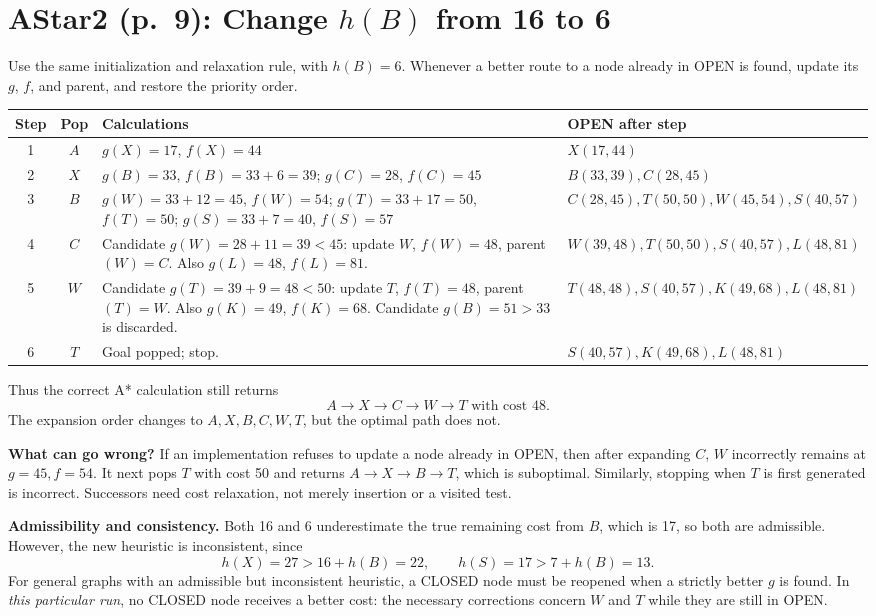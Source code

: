 \documentclass[11pt,a4paper]{article}
\newcommand{\question}[2]{\section*{#1: #2}}
\begin{document}
\newpage
\question{AStar2 (p.\ 9)}{Change $h(B)$ from 16 to 6}
Use the same initialization and relaxation rule, with $h(B)=6$. Whenever a better route to a node already in OPEN is found, update its $g$, $f$, and parent, and restore the priority order.
\begin{center}\small\begin{tabular}{c|c|p{6.2cm}|p{4.6cm}}\toprule
Step&Pop&Calculations&OPEN after step\\\midrule
1&$A$&$g(X)=17$, $f(X)=44$&$X(17,44)$\\
2&$X$&$g(B)=33$, $f(B)=33+6=39$; $g(C)=28$, $f(C)=45$&$B(33,39),C(28,45)$\\
3&$B$&$g(W)=33+12=45$, $f(W)=54$; $g(T)=33+17=50$, $f(T)=50$; $g(S)=33+7=40$, $f(S)=57$&$C(28,45),T(50,50),W(45,54),S(40,57)$\\
4&$C$&Candidate $g(W)=28+11=39<45$: update $W$, $f(W)=48$, parent$(W)=C$. Also $g(L)=48$, $f(L)=81$.&$W(39,48),T(50,50),S(40,57),L(48,81)$\\
5&$W$&Candidate $g(T)=39+9=48<50$: update $T$, $f(T)=48$, parent$(T)=W$. Also $g(K)=49$, $f(K)=68$. Candidate $g(B)=51>33$ is discarded.&$T(48,48),S(40,57),K(49,68),L(48,81)$\\
6&$T$&Goal popped; stop.&$S(40,57),K(49,68),L(48,81)$\\\bottomrule\end{tabular}\normalsize\end{center}
Thus the correct A* calculation still returns
\[
\boxed{A\to X\to C\to W\to T\text{ with cost }48}.
\]
The expansion order changes to $A,X,B,C,W,T$, but the optimal path does not.

\textbf{What can go wrong?} If an implementation refuses to update a node already in OPEN, then after expanding $C$, $W$ incorrectly remains at $g=45,f=54$. It next pops $T$ with cost 50 and returns $A\to X\to B\to T$, which is suboptimal. Similarly, stopping when $T$ is first generated is incorrect. Successors need cost relaxation, not merely insertion or a visited test.

\textbf{Admissibility and consistency.} Both 16 and 6 underestimate the true remaining cost from $B$, which is 17, so both are admissible. However, the new heuristic is inconsistent, since
\[
h(X)=27>16+h(B)=22,\qquad h(S)=17>7+h(B)=13.
\]
For general graphs with an admissible but inconsistent heuristic, a CLOSED node must be reopened when a strictly better $g$ is found. In \emph{this particular run}, no CLOSED node receives a better cost: the necessary corrections concern $W$ and $T$ while they are still in OPEN.
\end{document}
